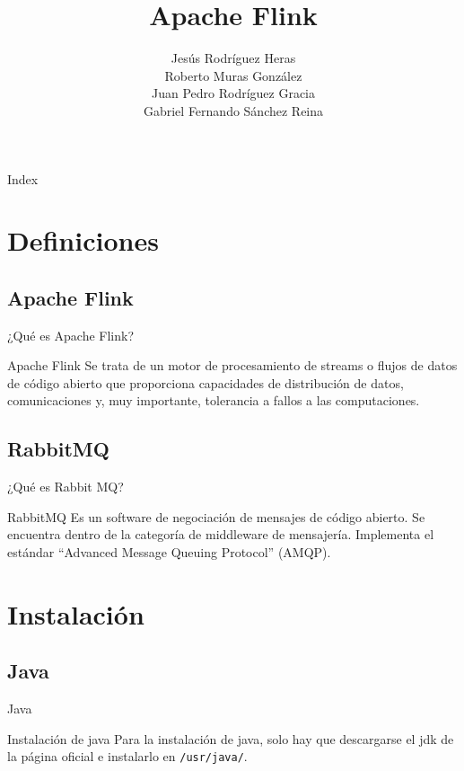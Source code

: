 \documentclass{beamer}
\title{Apache Flink}
\author{Jesús Rodríguez Heras\\Roberto Muras González\\Juan Pedro Rodríguez Gracia\\Gabriel Fernando Sánchez Reina}
\institute[Escuela Superior de Ingeniería] %
\begin{document}
\begin{frame}
  \titlepage
  
\end{frame}

\begin{frame}{Index}
  \tableofcontents
\end{frame}



\section{Definiciones}
\subsection{Apache Flink}
\begin{frame}{¿Qué es Apache Flink?}
	\begin{block}{Apache Flink}
		Se trata de un motor de procesamiento de streams o flujos de datos de código abierto que proporciona capacidades de distribución de datos, comunicaciones y, muy importante, tolerancia a fallos a las computaciones.
	\end{block}
\end{frame}

\subsection{RabbitMQ}
\begin{frame}{¿Qué es Rabbit MQ?}
	\begin{block}{RabbitMQ}
		Es un software de negociación de mensajes de código abierto. Se encuentra dentro de la categoría de middleware de mensajería. Implementa el estándar ``Advanced Message Queuing Protocol'' (AMQP).
	\end{block}
\end{frame}

\section{Instalación}
\subsection{Java}
\begin{frame}{Java}
	\begin{block}{Instalación de java}
		Para la instalación de java, solo hay que descargarse el jdk de la página oficial e instalarlo en \texttt{/usr/java/}.
	\end{block}
\end{frame}
\end{document}
